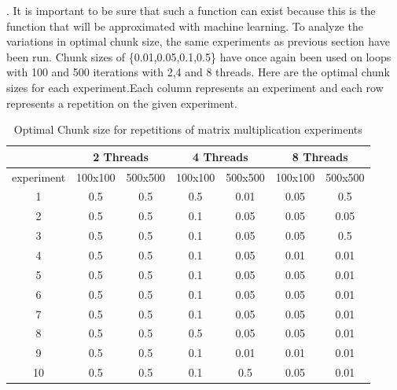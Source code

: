  . It is important to be sure that such a function can exist because this is the function that will be approximated with machine learning. To analyze the variations in optimal chunk size, the same experiments as previous section have been run. Chunk sizes of \{0.01,0.05,0.1,0.5\} have once again been used on loops with 100 and 500 iterations with 2,4 and 8 threads. Here are the optimal chunk sizes for each experiment.Each column represents an experiment and each row represents a repetition on the given experiment.
\begin{table}[H]
	\centering
	\caption{Optimal Chunk size for repetitions of matrix multiplication experiments}
	\label{my-label}
	\begin{tabular}{|c|c|c|c|c|c|c|}
		\hline
		&
		\multicolumn{2}{|c|}{2 Threads} & \multicolumn{2}{c|}{4 Threads} & \multicolumn{2}{c|}{8 Threads} \\ \hline
		experiment&100x100       & 500x500       & 100x100       & 500x500      & 100x100       & 500x500      \\ \hline
		1&0.5            & 0.5            & 0.5            & 0.01          & 0.05           & 0.5           \\ \hline
		2&0.5            & 0.5            & 0.1            & 0.05          & 0.05           & 0.05          \\ \hline
		3&0.5            & 0.5            & 0.1            & 0.05          & 0.05           & 0.5           \\ \hline
		4&0.5            & 0.5            & 0.1            & 0.05          & 0.01           & 0.01          \\ \hline
		5&0.5            & 0.5            & 0.1            & 0.05          & 0.05           & 0.01          \\ \hline
		6&0.5            & 0.5            & 0.1            & 0.05          & 0.05           & 0.01          \\ \hline
		7&0.5            & 0.5            & 0.1            & 0.05          & 0.05           & 0.01          \\ \hline
		8&0.5            & 0.5            & 0.5            & 0.05          & 0.05           & 0.01          \\ \hline
		9&0.5            & 0.5            & 0.1            & 0.01          & 0.01           & 0.01          \\ \hline
		10&0.5            & 0.5            & 0.1            & 0.5           & 0.05           & 0.01          \\ \hline
	\end{tabular}
\end{table}

